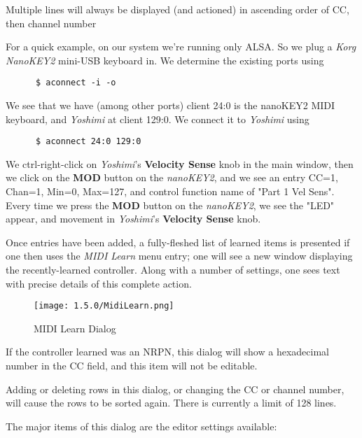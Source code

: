    Multiple lines will always be displayed (and actioned) in ascending order of
   CC, then channel number

   For a quick example, on our system we're running only ALSA.  So we
   plug a \textsl{Korg NanoKEY2} mini-USB keyboard in.
   We determine the existing ports using

   \begin{verbatim}
      $ aconnect -i -o
   \end{verbatim}

   We see that we have (among other ports) client 24:0 is the nanoKEY2 MIDI
   keyboard, and \textsl{Yoshimi} at client 129:0.
   We connect it to \textsl{Yoshimi} using

   \begin{verbatim}
      $ aconnect 24:0 129:0
   \end{verbatim}

   We ctrl-right-click on \textsl{Yoshimi}'s \textbf{Velocity Sense} knob in
   the main window, then we click on the \textbf{MOD} button on the
   \textsl{nanoKEY2}, and we see an entry CC=1, Chan=1, Min=0, Max=127, and
   control function name of "Part 1 Vel Sens".  Every time we press the
   \textbf{MOD} button on the \textsl{nanoKEY2}, we see the "LED" appear, and
   movement in \textsl{Yoshimi}'s \textbf{Velocity Sense} knob.

   Once entries have been added, a fully-fleshed list of learned items is
   presented if one then uses the \textsl{MIDI Learn} menu entry; one will
   see a new window displaying the recently-learned controller. Along with a
   number of settings, one sees text with precise details of this complete
   action.

\begin{figure}[H]
   \centering
   \texttt{[image: 1.5.0/MidiLearn.png]}
   \caption{MIDI Learn Dialog}
   \label{fig:midi_learn_dialog}
\end{figure}

   If the controller learned was an NRPN, this dialog will show a hexadecimal
   number in the CC field, and this item will not be editable.

   Adding or deleting rows in this dialog, or changing the CC or channel
   number, will cause the rows to be sorted again.
   There is currently a limit of 128 lines.

   The major items of this dialog are the editor settings available:

